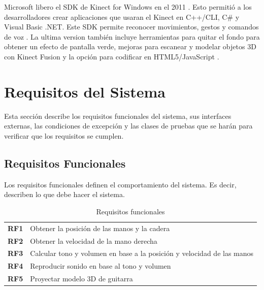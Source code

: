 \documentclass[a4paper,12pt]{article}
\begin{document}
Microsoft libero el SDK de Kinect for Windows en el 2011 \cite{kinect_release}. Esto permitió a los
desarrolladores crear aplicaciones que usaran el Kinect en C++/CLI, C\# y
Visual Basic .NET. Este SDK permite reconocer movimientos, gestos y comandos
de voz \cite{sdk}. La ultima version también incluye herramientas para quitar el fondo
para obtener un efecto de pantalla verde, mejoras para escanear y modelar
objetos 3D con Kinect Fusion y la opción para codificar en HTML5/JavaScript \cite{kinect_new}.

\section{Requisitos del Sistema}
Esta sección describe los requisitos funcionales del sistema, sus interfaces
externas, las condiciones de excepción y las clases de pruebas que se harán
para verificar que los requisitos se cumplen.
\subsection{Requisitos Funcionales}
Los requisitos funcionales definen el comportamiento del sistema. Es decir,
describen lo que debe hacer el sistema.
\begin{table}[h!]
        \centering
        \begin{tabular}{c l}
                \textbf{RF1} & Obtener la posición de las manos y la cadera \\
                \textbf{RF2} & Obtener la velocidad de la mano derecha \\
                \textbf{RF3} & Calcular tono y volumen en base a la posición
                y velocidad de las manos \\
                \textbf{RF4} & Reproducir sonido en base al tono y volumen \\
                \textbf{RF5} & Proyectar modelo 3D de guitarra \\
        \end{tabular}
        \caption{Requisitos funcionales}
        \label{tab:req_func}
\end{table}
\end{document}

